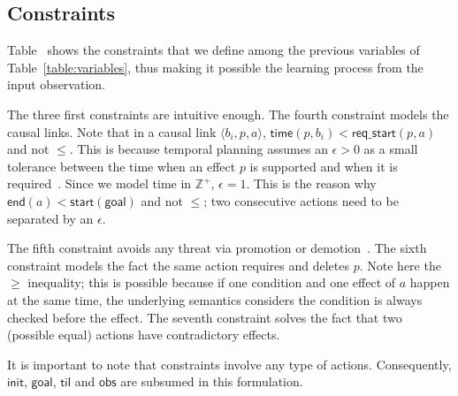 \documentclass[runningheads]{llncs}
\newcommand{\tup}[1]{{\langle #1 \rangle}}
\newcommand{\obs}{\mathsf{obs}}    %
\newcommand{\start}{\mathsf{start}}%
\newcommand{\en}{\mathsf{end}}     %
\newcommand{\til}{\mathsf{til}}    %
\newcommand{\tim}{\mathsf{time}}   %
\newcommand{\reqs}{\mathsf{req\_{start}}} %
\newcommand{\ini}{\mathsf{init}}   %
\newcommand{\goal}{\mathsf{goal}}  %
\begin{document}
\subsection{Constraints}

Table~\label{table:constraints} shows the constraints that we define among the previous variables of Table~\ref{table:variables}, thus making it possible the learning process from the input observation.

The three first constraints are intuitive enough. The fourth constraint models the causal links. Note that in a causal link $\tup{b_i,p,a}$, $\tim(p,b_i) < \reqs(p,a)$ and not $\leq$. This is because temporal planning assumes an $\epsilon > 0$ as a small tolerance between the time when an effect $p$ is supported and when it is required~\cite{fox2003pddl2}. Since we model time in $\mathbb{Z}^+$, $\epsilon=1$. This is the reason why $\en(a) < \start(\goal)$ and not $\leq$; two consecutive actions need to be separated by an $\epsilon$.

The fifth constraint avoids any threat via promotion or demotion~\cite{ghallab2004automated}. The sixth constraint models the fact the same action requires and deletes $p$. Note here the $\geq$ inequality; this is possible because if one condition and one effect of $a$ happen at the same time, the underlying semantics considers the condition is always checked before the effect. The seventh constraint solves the fact that two (possible equal) actions have contradictory effects.

It is important to note that constraints involve any type of actions. Consequently, $\ini$, $\goal$, $\til$ and $\obs$ are subsumed in this formulation.
\end{document}
